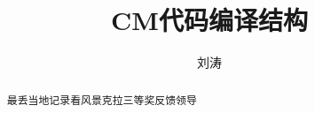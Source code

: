 \documentclass[12pt,a4paper]{article}
\title{CM代码编译结构}
\author{刘涛}
\renewcommand{\abstractname}{摘要}
\begin{document}
\maketitle{}

\begin{abstract}
最丢当地记录看风景克拉三等奖反馈领导
\end{abstract}
\clearpage
{}
\tableofcontents
\listoffigures{}
\clearpage
{}
\end{document}

